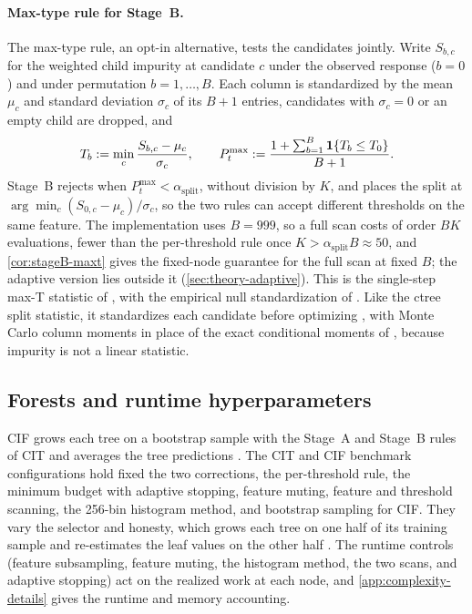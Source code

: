 \paragraph{Max-type rule for Stage~B.}
The max-type rule, an opt-in alternative, tests the candidates jointly. Write
$S_{b,c}$ for the weighted child impurity at candidate $c$ under the observed
response ($b=0$) and under permutation $b=1,\dots,B$. Each column is
standardized by the mean $\mu_c$ and standard deviation $\sigma_c$ of its $B+1$
entries, candidates with $\sigma_c=0$ or an empty child are dropped, and
%
\begin{equation}
  T_b := \min_{c} \frac{S_{b,c}-\mu_c}{\sigma_c},
  \qquad
  P^{\max}_{t} := \frac{1+\sum_{b=1}^{B}\mathbf{1}\{T_b \le T_0\}}{B+1}.
  \label{eq:maxt-stat}
\end{equation}
%
Stage~B rejects when $P^{\max}_t<\alpha_{\mathrm{split}}$, without division by
$K$, and places the split at $\arg\min_c (S_{0,c}-\mu_c)/\sigma_c$, so the two
rules can accept different thresholds on the same feature. The implementation
uses $B=999$, so a full scan costs of order $BK$ evaluations, fewer than the
per-threshold rule once $K>\alpha_{\mathrm{split}}B\approx 50$, and
\cref{cor:stageB-maxt} gives the fixed-node guarantee for the full scan at fixed $B$; the adaptive
version lies outside it (\cref{sec:theory-adaptive}). This is the single-step max-T statistic of
\citet{WestfallYoung1993ResamplingBasedMultipleTesting}, with the empirical
null standardization of \citet{PollardVanDerLaan2004NullDistribution}. Like the
ctree split statistic, it standardizes each candidate before optimizing
\citep{Hothorn2006UnbiasedRecursivePartitioning,LausenSchumacher1992MaximallySelectedRankStatistics,HothornZeileis2008GeneralizedMaximallySelectedStatistics},
with Monte Carlo column moments in place of the exact conditional moments of
\citet{StrasserWeber1999PermutationStatistics}, because impurity is not a
linear statistic.

\subsection{Forests and runtime hyperparameters}
\label{sec:bootstrap}

CIF grows each tree on a bootstrap sample with the Stage~A and Stage~B rules of
CIT and averages the tree predictions
\citep{Breiman2001RandomForests,HothornBuehlmannDudoitMolinaroVanDerLaan2006SurvivalEnsembles}.
The CIT and CIF benchmark configurations hold fixed the two corrections,
the per-threshold rule, the minimum budget with adaptive stopping, feature
muting, feature and threshold scanning, the 256-bin histogram method, and
bootstrap sampling for CIF. They vary the selector and honesty, which grows
each tree on one half of its training sample and re-estimates the leaf values
on the other half \citep{WagerAthey2018CausalForests}. The runtime controls
(feature subsampling, feature muting, the histogram method, the two scans, and
adaptive stopping) act on the realized work at each node, and
\cref{app:complexity-details} gives the runtime and memory accounting.

